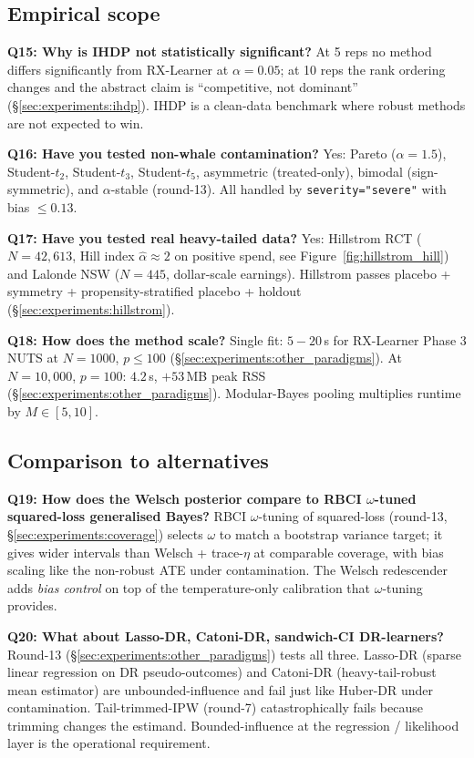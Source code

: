 \subsection{Empirical scope}

\textbf{Q15: Why is IHDP not statistically significant?}
At 5 reps no method differs significantly from RX-Learner at
$\alpha = 0.05$; at 10 reps the rank ordering changes and the
abstract claim is ``competitive, not dominant''
(\S\ref{sec:experiments:ihdp}). IHDP is a clean-data benchmark where
robust methods are not expected to win.

\textbf{Q16: Have you tested non-whale contamination?}
Yes: Pareto ($\alpha = 1.5$), Student-$t_2$, Student-$t_3$,
Student-$t_5$, asymmetric (treated-only), bimodal (sign-symmetric),
and $\alpha$-stable (round-13). All handled by
\texttt{severity="severe"} with bias $\le 0.13$.

\textbf{Q17: Have you tested real heavy-tailed data?}
Yes: Hillstrom RCT ($N = 42{,}613$, Hill index $\hat\alpha \approx 2$
on positive spend, see Figure~\ref{fig:hillstrom_hill}) and Lalonde NSW
($N = 445$, dollar-scale earnings). Hillstrom passes placebo + symmetry
+ propensity-stratified placebo + holdout (\S\ref{sec:experiments:hillstrom}).

\textbf{Q18: How does the method scale?}
Single fit: $5{-}20$\,s for RX-Learner Phase 3 NUTS at $N = 1000$, $p
\le 100$ (\S\ref{sec:experiments:other_paradigms}). At $N = 10{,}000$,
$p = 100$: $4.2$\,s, $+53$\,MB peak RSS
(\S\ref{sec:experiments:other_paradigms}). Modular-Bayes pooling
multiplies runtime by $M \in [5, 10]$.

\subsection{Comparison to alternatives}

\textbf{Q19: How does the Welsch posterior compare to RBCI
$\omega$-tuned squared-loss generalised Bayes?}
RBCI $\omega$-tuning of squared-loss (round-13,
\S\ref{sec:experiments:coverage}) selects $\omega$ to match a
bootstrap variance target; it gives wider intervals than Welsch +
trace-$\eta$ at comparable coverage, with bias scaling like the
non-robust ATE under contamination. The Welsch redescender adds
\emph{bias control} on top of the temperature-only calibration that
$\omega$-tuning provides.

\textbf{Q20: What about Lasso-DR, Catoni-DR, sandwich-CI DR-learners?}
Round-13 (\S\ref{sec:experiments:other_paradigms}) tests all three.
Lasso-DR (sparse linear regression on DR pseudo-outcomes) and
Catoni-DR (heavy-tail-robust mean estimator) are unbounded-influence
and fail just like Huber-DR under contamination. Tail-trimmed-IPW (round-7) catastrophically
fails because trimming changes the estimand. Bounded-influence at
the regression / likelihood layer is the operational requirement.

